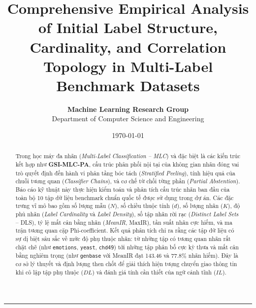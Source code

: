 \documentclass[11pt,a4paper]{article}
\begin{document}
\title{\textbf{\Large Comprehensive Empirical Analysis of Initial Label Structure,\\ Cardinality, and Correlation Topology in Multi-Label Benchmark Datasets}}
\author{\textbf{Machine Learning Research Group} \\ Department of Computer Science and Engineering}
\date{\today}
\maketitle

\begin{abstract}
Trong học máy đa nhãn (\textit{Multi-Label Classification -- MLC}) và đặc biệt là các kiến trúc kết hợp như \textbf{GSI-MLC-PA}, cấu trúc phân phối nội tại của không gian nhãn đóng vai trò quyết định đến hành vi phân tầng bóc tách (\textit{Stratified Peeling}), tính hiệu quả của chuỗi tương quan (\textit{Classifier Chains}), và cơ chế từ chối từng phần (\textit{Partial Abstention}). Báo cáo kỹ thuật này thực hiện kiểm toán và phân tích cấu trúc nhãn ban đầu của toàn bộ 10 tập dữ liệu benchmark chuẩn quốc tế được sử dụng trong dự án. Các đặc trưng vĩ mô bao gồm số lượng mẫu ($N$), số chiều thuộc tính ($d$), số lượng nhãn ($K$), độ phủ nhãn (\textit{Label Cardinality} và \textit{Label Density}), số tập nhãn rời rạc (\textit{Distinct Label Sets} -- DLS), tỷ lệ mất cân bằng nhãn (\textit{MeanIR}, MaxIR), tần suất nhãn cực hiếm, và ma trận tương quan cặp Phi-coefficient. Kết quả phân tích chỉ ra rằng các tập dữ liệu có sự dị biệt sâu sắc về mức độ phụ thuộc nhãn: từ những tập có tương quan nhãn rất chặt chẽ (như \texttt{emotions}, \texttt{yeast}, \texttt{chd49}) tới những tập phân bố cực kỳ thưa và mất cân bằng nghiêm trọng (như \texttt{genbase} với MeanIR đạt 143.46 và 77.8\% nhãn hiếm). Đây là cơ sở lý thuyết và định lượng then chốt để giải thích hiện tượng chuyển giao thông tin khi cô lập tập phụ thuộc ($DL$) và đánh giá tính cần thiết của ngữ cảnh tĩnh ($IL$).
\end{abstract}

\vspace{0.5em}
\tableofcontents
\vspace{1em}
\hrule
\vspace{1em}
\end{document}
